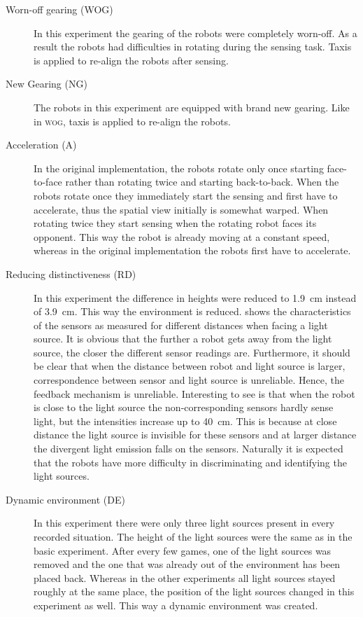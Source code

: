 \begin{description}
\item[Worn-off gearing (WOG)] In this experiment the gearing of the robots were completely worn-off. As a result the robots had difficulties in rotating during the sensing task. Taxis is applied to re-align the robots after sensing.

\item[New Gearing (NG)] The robots in this experiment are equipped with brand new gearing. Like in {\scshape wog}, taxis is applied to re-align the robots. 

\item[Acceleration (A)] In the original implementation, the robots rotate only once starting face-to-face \citep{steelsvogt:1997} rather than rotating twice and starting back-to-back. When the robots rotate once they immediately start the sensing and first have to accelerate, thus the spatial view initially is somewhat warped. When rotating twice they start sensing when the rotating robot faces its opponent. This way the robot is already moving at a constant speed, whereas in the original implementation the robots first have to accelerate.

\item[Reducing distinctiveness (RD)] In this experiment the difference in heights were reduced to 1.9~cm instead of 3.9~cm. This way the environment is reduced.  shows the characteristics of the sensors as measured for different distances when facing a light source. It is obvious that the further a robot gets away from the light source, the closer the different sensor readings are. Furthermore, it should be clear that when the distance between robot and light source is larger, correspondence between sensor and light source is unreliable. Hence, the feedback mechanism is unreliable. Interesting to see is that when the robot is close to the light source the non-corresponding sensors hardly sense light, but the intensities increase up to 40~cm. This is because at close distance the light source is invisible for these sensors and at larger distance the divergent light emission falls on the sensors. Naturally it is expected that the robots have more difficulty in discriminating and identifying the light sources.

\item[Dynamic environment (DE)] In this experiment there were only three light sources present in every recorded situation. The height of the light sources were the same as in the basic experiment. After every few games, one of the light sources was removed and the one that was already out of the environment has been placed back. Whereas in the other experiments all light sources stayed roughly at the same place, the position of the light sources changed in this experiment as well. This way a dynamic environment was created.
\end{description}


